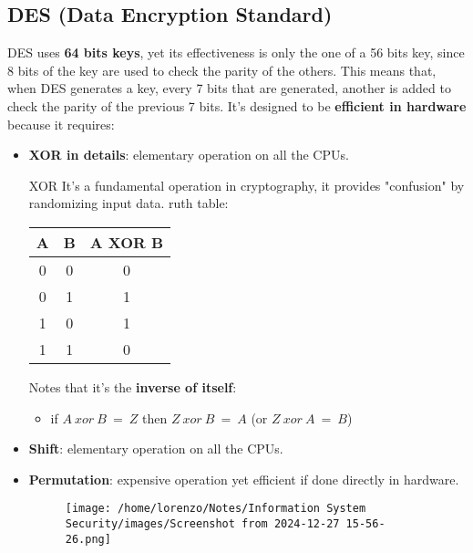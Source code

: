 \newpage
\subsection{DES (Data Encryption Standard)}
DES uses \textbf{64 bits keys}, yet its effectiveness is only the one of a 56 bits key, since 8 bits of the key are used to check the parity of the others. This means that, when DES generates a key, every 7 bits that are generated, another is added to check the parity of the previous 7 bits. It's designed to be \textbf{efficient in hardware} because it requires: 
\begin{itemize}
    \item \textbf{XOR in details}: elementary operation on all the CPUs.
    \begin{quotebox}[colframe=blue!10!white, colback=blue!5!white]{XOR}
        It's a fundamental operation in cryptography, it provides "confusion" by randomizing input data.
        ruth table:
        \begin{center}
        \begin{tabular}{|c|c|c|}

\hline
A & B & A XOR B \\
\hline
0 & 0 & 0 \\
0 & 1 & 1 \\
1 & 0 & 1 \\
1 & 1 & 0 \\
\hline
\end{tabular}
\end{center}

Notes that it's the \textbf{inverse of itself}:
\begin{itemize}
    \item if \(A\ xor\ B\ =\ Z\) then \(Z\ xor\ B\ =\ A\) (or \(Z\ xor\ A\ =\ B\))
\end{itemize}
    \end{quotebox}
    \item \textbf{Shift}: elementary operation on all the CPUs.
    \item \textbf{Permutation}: expensive operation  yet efficient if done directly in hardware.
    \begin{figure}[H]
        \centering
        \texttt{[image: /home/lorenzo/Notes/Information System Security/images/Screenshot from 2024-12-27 15-56-26.png]}
    \end{figure}
\end{itemize}

